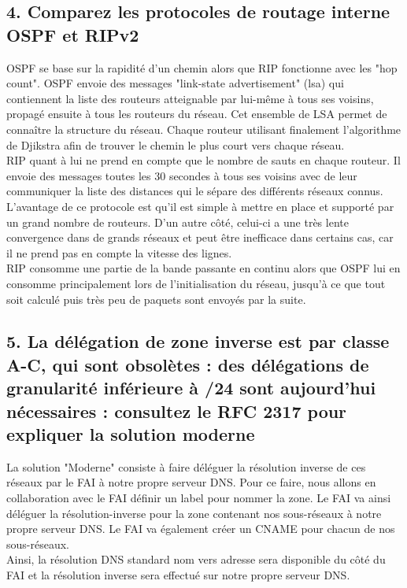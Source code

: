 \documentclass{article}
\begin{document}
\subsection*{4. Comparez les protocoles de routage interne OSPF et RIPv2}
OSPF\cite{OSPF} se base sur la rapidité d'un chemin alors que RIP\cite{RIP} fonctionne avec les "hop count". OSPF envoie des messages "link-state advertisement" (lsa) qui contiennent la liste des routeurs atteignable par lui-même à tous ses voisins, propagé ensuite à tous les routeurs du réseau. Cet ensemble de LSA permet de connaître la structure du réseau. Chaque routeur utilisant finalement l'algorithme de Djikstra afin de trouver le chemin le plus court vers chaque réseau.\\

RIP quant à lui ne prend en compte que le nombre de sauts en chaque routeur. Il envoie des messages toutes les 30 secondes à tous ses voisins avec de leur communiquer la liste des distances qui le sépare des différents réseaux connus. L'avantage de ce protocole est qu'il est simple à mettre en place et supporté par un grand nombre de routeurs. D'un autre côté, celui-ci a une très lente convergence dans de grands réseaux et peut être inefficace dans certains cas, car il ne prend pas en compte la vitesse des lignes.\cite{RIP-VS-OSPF}\\

RIP consomme une partie de la bande passante en continu alors que OSPF lui en consomme principalement lors de l'initialisation du réseau, jusqu'à ce que tout soit calculé puis très peu de paquets sont envoyés par la suite.\\

\subsection*{5. La délégation de zone inverse est par classe A-C, qui sont obsolètes : des délégations de granularité inférieure à /24 sont aujourd’hui nécessaires : consultez le RFC 2317 pour expliquer la solution moderne}
La solution "Moderne" consiste à faire déléguer la résolution inverse de ces réseaux par le FAI à notre propre serveur DNS. Pour ce faire, nous allons en collaboration avec le FAI définir un label pour nommer la zone. Le FAI va ainsi déléguer la résolution-inverse pour la zone contenant nos sous-réseaux à notre propre serveur DNS. Le FAI va également créer un CNAME pour chacun de nos sous-réseaux.\\

Ainsi, la résolution DNS standard nom vers adresse sera disponible du côté du FAI et la résolution inverse sera effectué sur notre propre serveur DNS\cite{RFC-2317-ietf}\cite{RFC-2317-divers}.
\end{document}
